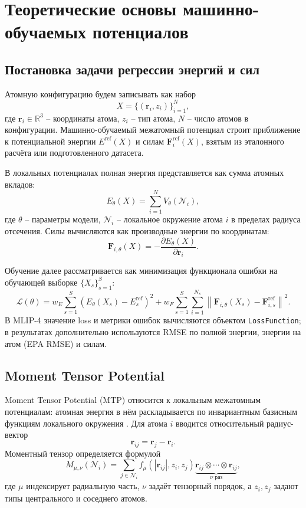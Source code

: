 \section{Теоретические основы машинно-обучаемых потенциалов}
\label{sec:theory}

\subsection{Постановка задачи регрессии энергий и сил}

Атомную конфигурацию будем записывать как набор
\[
    X = \{(\mathbf r_i, z_i)\}_{i=1}^{N},
\]
где \(\mathbf r_i \in \mathbb R^3\) -- координаты атома, \(z_i\) -- тип атома, \(N\) -- число атомов в конфигурации. Машинно-обучаемый межатомный потенциал строит приближение к потенциальной энергии \(E^{\mathrm{ref}}(X)\) и силам \(\mathbf F^{\mathrm{ref}}_{i}(X)\), взятым из эталонного расчёта или подготовленного датасета.

В локальных потенциалах полная энергия представляется как сумма атомных вкладов:
\[
    E_\theta(X) = \sum_{i=1}^{N} V_\theta(\mathcal N_i),
\]
где \(\theta\) -- параметры модели, \(\mathcal N_i\) -- локальное окружение атома \(i\) в пределах радиуса отсечения. Силы вычисляются как производные энергии по координатам:
\[
    \mathbf F_{i,\theta}(X) =
    -\frac{\partial E_\theta(X)}{\partial \mathbf r_i}.
\]

Обучение далее рассматривается как минимизация функционала ошибки на обучающей выборке \(\{X_s\}_{s=1}^{S}\):
\[
\mathcal L(\theta)
=
w_E \sum_{s=1}^{S}
\left(
E_\theta(X_s) - E_s^{\mathrm{ref}}
\right)^2
+
w_F \sum_{s=1}^{S}
\sum_{i=1}^{N_s}
\left\|
\mathbf F_{i,\theta}(X_s)
-
\mathbf F_{i,s}^{\mathrm{ref}}
\right\|^2 .
\]
В MLIP-4 значение loss и метрики ошибок вычисляются объектом \texttt{LossFunction}; в результатах дополнительно используются RMSE по полной энергии, энергии на атом (EPA RMSE) и силам.

\subsection{Moment Tensor Potential}

Moment Tensor Potential (MTP) относится к локальным межатомным потенциалам: атомная энергия в нём раскладывается по инвариантным базисным функциям локального окружения \cite{shapeev2016mtp,novikov2021mlip}. Для атома \(i\) вводится относительный радиус-вектор
\[
    \mathbf r_{ij} = \mathbf r_j - \mathbf r_i .
\]
Моментный тензор определяется формулой
\[
M_{\mu,\nu}(\mathcal N_i)
=
\sum_{j \in \mathcal N_i}
f_\mu
\left(
|\mathbf r_{ij}|, z_i, z_j
\right)
\underbrace{
\mathbf r_{ij} \otimes \cdots \otimes \mathbf r_{ij}
}_{\nu \text{ раз}},
\]
где \(\mu\) индексирует радиальную часть, \(\nu\) задаёт тензорный порядок, а \(z_i,z_j\) задают типы центрального и соседнего атомов.

